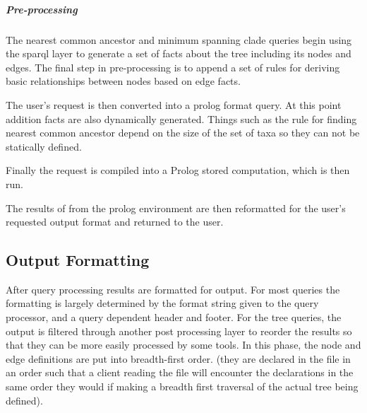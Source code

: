 \documentclass[10pt]{article}
\begin{document}
       \subparagraph{Pre-processing}
       The nearest common ancestor and minimum spanning clade queries begin using the sparql layer to generate a set of facts about the tree
       including its nodes and edges. The final step in pre-processing is to append a set of rules for deriving basic relationships between nodes
       based on edge facts.

       The user's request is then converted into a prolog format query. At this point addition facts are also dynamically generated. Things such
       as the rule for finding nearest common ancestor depend on the size of the set of taxa so they can not be statically defined. 
       
       Finally the request is compiled into a Prolog stored computation, which is then run. 

       The results of from the prolog environment are then reformatted for the user's requested output format and returned to the user.
  \subsection{Output Formatting}
     After query processing results are formatted for output. For most queries the formatting is largely
     determined by the format string given to the query processor, and a query dependent header and footer.
     For the tree queries, the output is filtered through another post processing layer to reorder the 
     results so that they can be more easily processed by some tools. In this phase, the node and edge
     definitions are put into breadth-first order. (they are declared in the file in an order such that
     a client reading the file will encounter the declarations in the same order they would if making a
     breadth first traversal of the actual tree being defined).
\end{document}
